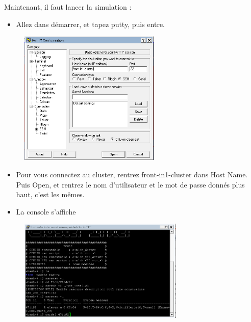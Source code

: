 \documentclass[a4paper, 11pt]{report}
\begin{document}
Maintenant, il faut lancer la simulation :

\begin{itemize}
\item Allez dans démarrer, et tapez putty, puis entre.
\end{itemize}

\begin{figure}[h]
	\begin{center}	\includegraphics[width=0.6\textwidth]{images/CFD2.png}
	\end{center}
\end{figure}

\begin{itemize}
\item Pour vous connectez au cluster, rentrez front-in1-cluster dans Host Name. Puis Open, et rentrez le nom d’utilisateur et le mot de passe donnés plus haut, c’est les mêmes.
\item La console s’affiche 
\end{itemize}

\begin{figure}[h]
	\begin{center}	\includegraphics[width=0.7\textwidth]{images/CFD3.png}
	\end{center}
\end{figure}
\end{document}
